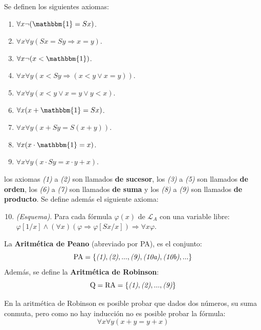 \documentclass[12pt]{report}
\newcounter{it}
\theoremstyle{largebreak}
\newcommand{\bbm}[1]{\ensuremath{\mathbbm{#1}}}
\begin{document}
    \begin{mydef}
        Se definen los siguientes axiomas:
        \begin{enumerate}[label = \textit{(\arabic*)}]
            \item $\forall x\neg(\bbm{1}= Sx)$.
            \item $\forall x\forall y(Sx = Sy\Rightarrow x=y)$.
            \item $\forall x\neg(x<\bbm{1})$.
            \item $\forall x\forall y(x<Sy\Rightarrow(x<y\lor x=y))$.
            \item $\forall x\forall y(x<y\lor x=y\lor y<x)$.
            \item $\forall x(x+\bbm{1}=Sx)$.
            \item $\forall x\forall y(x+Sy=S(x+y))$.
            \item $\forall x(x\cdot\bbm{1}=x)$.
            \item $\forall x\forall y(x\cdot Sy=x\cdot y+x)$.
        \end{enumerate}
        los axiomas \textit{(1)} a \textit{(2)} son llamados \textbf{de sucesor}, los \textit{(3)} a \textit{(5)} son llamados \textbf{de orden}, los \textit{(6)} a \textit{(7)} son llamados \textbf{de suma} y los \textit{(8)} a \textit{(9)} son llamados \textbf{de producto}. Se define además el siguiente axioma:
        \begin{enumerate}[label = \textit{(\arabic*)}]
            \setcounter{enumi}{9}
            \item \textit{(Esquema)}. Para cada fórmula $\varphi(x)$ de $\mathcal{L}_A$ con una variable libre: $\varphi[1/x]\land(\forall x)(\varphi\Rightarrow\varphi[Sx/x])\Rightarrow \forall x\varphi$.
        \end{enumerate}

        La \textbf{Aritmética de Peano} (abreviado por PA), es el conjunto:
        \begin{equation*}
            \textup{PA}=\left\{\textup{\textit{(1)}},\textup{\textit{(2)}},...,\textup{\textit{(9)}},\textup{\textit{(10a)}},\textup{\textit{(10b)}},... \right\}
        \end{equation*}
        Además, se define la \textbf{Aritmética de Robinson}:
        \begin{equation*}
            \textup{Q}=\textup{RA}=\left\{\textup{\textit{(1)}},\textup{\textit{(2)}},...,\textup{\textit{(9)}} \right\}
        \end{equation*}
    \end{mydef}

    En la aritmética de Robinson es posible probar que dados dos números, su suma conmuta, pero como no hay inducción no es posible probar la fórmula:
    \begin{equation*}
        \forall x\forall y(x+y=y+x)
    \end{equation*}
\end{document}
